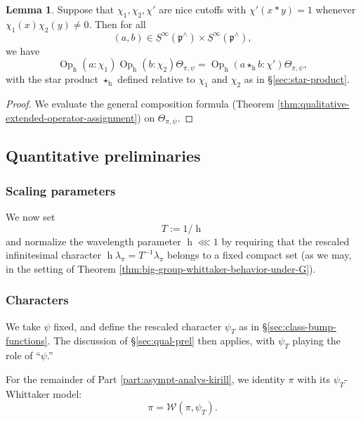 \documentclass[reqno]{amsart}
\DeclareMathOperator{\h}{h}
\DeclareMathOperator{\Opp}{Op}
\theoremstyle{plain} \newtheorem{theorem} {Theorem}
\theoremstyle{definition} \newtheorem{definition} [theorem] {Definition}
\theoremstyle{itplain} %
\newtheorem{lemma}[theorem]{Lemma}
\numberwithin{equation}{section}
\numberwithin{theorem}{section}
\begin{document}
\begin{lemma}\label{lem:action-opp-on-cal-W-delta}
  Suppose that $\chi_1, \chi_2, \chi '$ are nice cutoffs with $\chi '(x \ast y) = 1$ whenever $\chi_1(x) \chi_2(y) \neq 0$.  Then for all
  \begin{equation*}
    (a,b) \in \underline{S} ^\infty (\mathfrak{p}^\wedge ) \times \underline{S} ^{\infty } (\mathfrak{p} ^\wedge ),
  \end{equation*}
  we have
  \begin{equation*}
    \Opp_{\h}(a:\chi_1) 
    \Opp_{\h}(b:\chi_2)  \Theta_{\pi,\psi}
    =
    \Opp_{\h}(a \star_{\h} b:\chi ') \Theta_{\pi,\psi},
  \end{equation*}
  with the star product $\star_{\h}$ defined relative to $\chi_1$ and $\chi_2$ as in \S\ref{sec:star-product}.
\end{lemma}
\begin{proof}
  We evaluate the general composition formula (Theorem \ref{thm:qualitative-extended-operator-assignment}) on $\Theta_{\pi,\psi}$.
\end{proof}

\subsection{Quantitative preliminaries}\label{sec:quant-prel}

\subsubsection{Scaling parameters}
We now
set
\begin{equation*}
T := 1/\h
\end{equation*}
and normalize the wavelength parameter $\h \lll 1$ by requiring that the rescaled infinitesimal character $\h \lambda_\pi = T^{-1} \lambda_\pi$ belongs to a fixed compact set (as we may, in the setting of Theorem \ref{thm:big-group-whittaker-behavior-under-G}).

\subsubsection{Characters}
We take $\psi$ fixed, and define the rescaled character $\psi_T$ as in \S\ref{sec:class-bump-functions}.  The discussion of \S\ref{sec:qual-prel} then applies, with $\psi_T$ playing the role of ``$\psi$.''

For the remainder of Part \ref{part:asympt-analys-kirill}, we identity $\pi$ with its $\psi_T$-Whittaker model:
\begin{equation*}
  \pi = \mathcal{W}(\pi, \psi_T).
\end{equation*}
\end{document}
